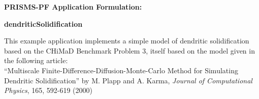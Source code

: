 \documentclass[10pt]{article}
\begin{document}
\def\Bomega{\mbox{\boldmath$\omega$}}
\def\Bvarepsilon{\mbox{\boldmath$\varepsilon$}}
\def\Bvartheta{\mbox{\boldmath$\vartheta$}}
\def\Bvarpi{\mbox{\boldmath$\varpi$}}
\def\Bvarrho{\mbox{\boldmath$\varrho$}}
\def\Bvarsigma{\mbox{\boldmath$\varsigma$}}
\def\Bvarphi{\mbox{\boldmath$\varphi$}}
\def\bone{\mathbf{1}}
\def\bzero{\mathbf{0}}
\def\bA{\mbox{\boldmath$ A$}}
\def\bB{\mbox{\boldmath$ B$}}
\def\bC{\mbox{\boldmath$ C$}}
\def\bD{\mbox{\boldmath$ D$}}
\def\bE{\mbox{\boldmath$ E$}}
\def\bF{\mbox{\boldmath$ F$}}
\def\bG{\mbox{\boldmath$ G$}}
\def\bH{\mbox{\boldmath$ H$}}
\def\bI{\mbox{\boldmath$ I$}}
\def\bJ{\mbox{\boldmath$ J$}}
\def\bK{\mbox{\boldmath$ K$}}
\def\bL{\mbox{\boldmath$ L$}}
\def\bM{\mbox{\boldmath$ M$}}
\def\bN{\mbox{\boldmath$ N$}}
\def\bO{\mbox{\boldmath$ O$}}
\def\bP{\mbox{\boldmath$ P$}}
\def\bQ{\mbox{\boldmath$ Q$}}
\def\bR{\mbox{\boldmath$ R$}}
\def\bS{\mbox{\boldmath$ S$}}
\def\bT{\mbox{\boldmath$ T$}}
\def\bU{\mbox{\boldmath$ U$}}
\def\bV{\mbox{\boldmath$ V$}}
\def\bW{\mbox{\boldmath$ W$}}
\def\bX{\mbox{\boldmath$ X$}}
\def\bY{\mbox{\boldmath$ Y$}}
\def\bZ{\mbox{\boldmath$ Z$}}
\def\ba{\mbox{\boldmath$ a$}}
\def\bb{\mbox{\boldmath$ b$}}
\def\bc{\mbox{\boldmath$ c$}}
\def\bd{\mbox{\boldmath$ d$}}
\def\be{\mbox{\boldmath$ e$}}
\def\bff{\mbox{\boldmath$ f$}}
\def\bg{\mbox{\boldmath$ g$}}
\def\bh{\mbox{\boldmath$ h$}}
\def\bi{\mbox{\boldmath$ i$}}
\def\bj{\mbox{\boldmath$ j$}}
\def\bk{\mbox{\boldmath$ k$}}
\def\bl{\mbox{\boldmath$ l$}}
\def\bm{\mbox{\boldmath$ m$}}
\def\bn{\mbox{\boldmath$ n$}}
\def\bo{\mbox{\boldmath$ o$}}
\def\bp{\mbox{\boldmath$ p$}}
\def\bq{\mbox{\boldmath$ q$}}
\def\br{\mbox{\boldmath$ r$}}
\def\bs{\mbox{\boldmath$ s$}}
\def\bt{\mbox{\boldmath$ t$}}
\def\bu{\mbox{\boldmath$ u$}}
\def\bv{\mbox{\boldmath$ v$}}
\def\bw{\mbox{\boldmath$ w$}}
\def\bx{\mbox{\boldmath$ x$}}
\def\by{\mbox{\boldmath$ y$}}
\def\bz{\mbox{\boldmath$ z$}}
\centerline{\Large{\bf PRISMS-PF Application Formulation:}}
\smallskip
\centerline{\Large{\bf dendriticSolidification}}
\bigskip

This example application implements a simple model of dendritic solidification based on the CHiMaD Benchmark Problem 3, itself based on the model given in the following article: \\
``Multiscale Finite-Difference-Diffusion-Monte-Carlo Method for Simulating Dendritic Solidification'' by M. Plapp and A. Karma, \emph{Journal of Computational Physics}, 165, 592-619 (2000)
\end{document}
